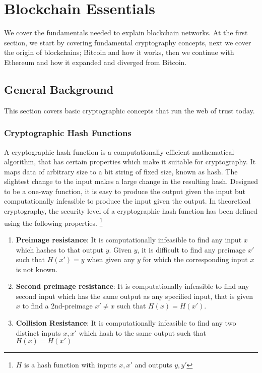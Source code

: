\chapter{Blockchain Essentials}
We cover the fundamentals needed to explain blockchain networks. At the first section, we start by covering fundamental cryptography concepts, next we cover the origin of blockchains; Bitcoin and how it works, then we continue with Ethereum and how it expanded and diverged from Bitcoin.

\section{General Background}
This section covers basic cryptographic concepts that run the web of trust today.

\subsection{Cryptographic Hash Functions}
A cryptographic hash function is a computationally efficient mathematical algorithm, that has certain properties which make it suitable for cryptography. It maps data of arbitrary size to a bit string of fixed size, known as hash. The slightest change to the input makes a large change in the resulting hash. Designed to be a one-way function, it is easy to produce the output given the input but computationally infeasible to produce the input given the output. In theoretical cryptography, the security level of a cryptographic hash function has been defined using the following properties. \footnote{$H$ is a hash function with inputs $x,x'$ and outputs $y,y'$} \cite{katz1996handbook}

\begin{enumerate} 
    \item \textbf{Preimage resistance}: It is computationally infeasible to find any input $x$ which hashes to that output $y$. Given $y$, it is difficult to find any preimage $x'$ such that $H(x')=y$ when given any $y$ for which the corresponding input $x$ is not known. 
    \item \textbf{Second preimage resistance}: It is computationally infeasible to find any second input which has the same output as any specified input, that is given $x$ to find a 2nd-preimage $x'\neq x$ such that $H(x)=H(x')$.
    \item \textbf{Collision Resistance}: It is computationally infeasible to find any two distinct inputs $x,x'$ which hash to the same output such that $H(x)=H(x')$
\end{enumerate}
